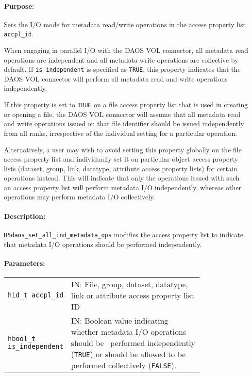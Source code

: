 \documentclass[../users_guide.tex]{subfiles}
\begin{document}
\paragraph{Purpose:}
\begin{flushleft}%
Sets the I/O mode for metadata read/write operations in the access property list \texttt{accpl\_id}.

When engaging in parallel I/O with the DAOS VOL connector, all metadata read operations are
independent and all metadata write operations are collective by default. If \texttt{is\_independent} is
specified as \texttt{TRUE}, this property indicates that the DAOS VOL connector will perform all metadata
read and write operations independently.

If this property is set to \texttt{TRUE} on a file access property list that is used in creating or opening
a file, the DAOS VOL connector will assume that all metadata read and write operations issued on that file
identifier should be issued independently from all ranks, irrespective of the individual setting for a
particular operation.

Alternatively, a user may wish to avoid setting this property globally on the file access property list
and individually set it on particular object access property lists (dataset, group, link, datatype, attribute
access property lists) for certain operations instead. This will indicate that only the operations issued
with such an access property list will perform metadata I/O independently, whereas other operations may
perform metadata I/O collectively.  

\end{flushleft}%

\paragraph{Description:}
\begin{flushleft}%
\texttt{H5daos\_set\_all\_ind\_metadata\_ops} modifies the access property list to indicate
that metadata I/O operations should be performed independently.
\end{flushleft}%

\paragraph{Parameters:}
\begin{flushleft}%
 \begin{tabular}{lp{0.8\linewidth}}%
   \texttt{hid\_t accpl\_id} & IN: File, group, dataset, datatype, link or attribute access property list ID \\
   \texttt{hbool\_t is\_independent} & IN: Boolean value indicating whether metadata I/O operations should be \
   performed independently (\texttt{TRUE}) or should be allowed to be performed collectively (\texttt{FALSE}). \\
 \end{tabular}%
\end{flushleft}%
\end{document}
